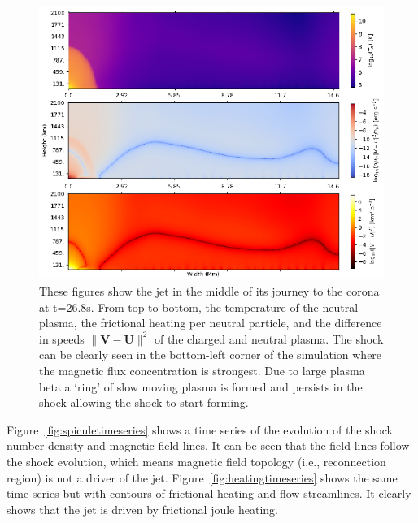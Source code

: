 \documentclass[12pt,upcase]{umlthesis}
\begin{document}
\begin{figure}[ht!]
	\centering
    \includegraphics[width=1\textwidth]{images/midspicule.eps}
	\caption{These figures show the jet in the middle of its journey to the corona at t=26.8s. From top to bottom, the temperature of the neutral plasma, the frictional heating per neutral particle, and the difference in speeds $\| \textbf{V} - \textbf{U} \|^2$ of the charged and neutral plasma. The shock can be clearly seen in the bottom-left corner of the simulation where the magnetic flux concentration is strongest. Due to large plasma beta a `ring' of slow moving plasma is formed and persists in the shock allowing the shock to start forming.}\label{fig:midspicule}
\end{figure}

Figure~\ref{fig:spiculetimeseries} shows a time series of the evolution of the shock number density and magnetic field lines. It can be seen that the field lines follow the shock evolution, which means magnetic field topology (i.e., reconnection region) is not a driver of the jet. Figure~\ref{fig:heatingtimeseries} shows the same time series but with contours of frictional heating and flow streamlines. It clearly shows that the jet is driven by frictional joule heating.
\end{document}
